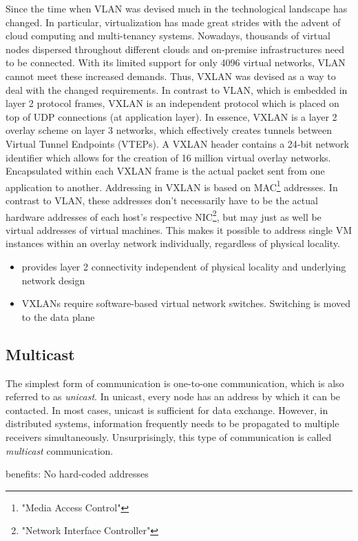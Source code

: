 Since the time when VLAN was devised much in the technological landscape has changed. In particular, virtualization has made great strides with the advent of cloud computing and multi-tenancy systems. Nowadays, thousands of virtual nodes dispersed throughout different clouds and on-premise infrastructures need to be connected. With its limited support for only 4096 virtual networks, VLAN cannot meet these increased demands. Thus, VXLAN was devised as a way to deal with the changed requirements. In contrast to VLAN, which is embedded in layer 2 protocol frames, VXLAN is an independent protocol which is placed on top of UDP connections (at application layer). In essence, VXLAN is a layer 2 overlay scheme on layer 3 networks, which effectively creates tunnels between Virtual Tunnel Endpoints (VTEPs). A VXLAN header contains a 24-bit network identifier which allows for the creation of 16 million virtual overlay networks. Encapsulated within each VXLAN frame is the actual packet sent from one application to another. Addressing in VXLAN is based on MAC\footnote{"Media Access Control"} addresses. In contrast to VLAN, these addresses don't necessarily have to be the actual hardware addresses of each host's respective NIC\footnote{"Network Interface Controller"}, but may just as well be virtual addresses of virtual machines. This makes it possible to address single VM instances within an overlay network individually, regardless of physical locality. 


\begin{itemize}
	\item provides layer 2 connectivity independent of physical locality and underlying network design
	\item VXLANs require software-based virtual network switches. Switching is moved to the data plane
\end{itemize}

\subsection{Multicast}
The simplest form of communication is one-to-one communication, which is also referred to as \emph{unicast}. In unicast, every node has an address by which it can be contacted. In most cases, unicast is sufficient for data exchange. However, in distributed systems, information frequently needs to be propagated to multiple receivers simultaneously. Unsurprisingly, this type of communication is called \emph{multicast} communication. 

benefits: No hard-coded addresses

